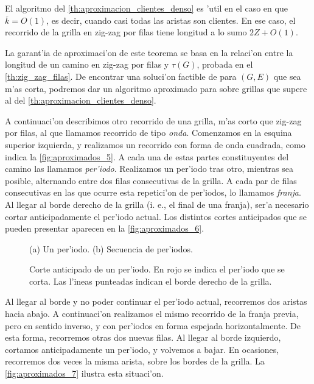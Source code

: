 El algoritmo del \autoref{th:aproximacion_clientes_denso} es 'util en el caso en que $\overline{k} = O(1)$, es decir, cuando casi todas las aristas son clientes. En ese caso, el recorrido de la grilla en zig-zag por filas tiene longitud a lo sumo $2Z + O(1)$.

La garant'ia de aproximaci'on de este teorema se basa en la relaci'on entre la longitud de un camino en zig-zag por filas y $\tau(G)$, probada en el \autoref{th:zig_zag_filas}. De encontrar una soluci'on factible de  para $(G, E)$ que sea m'as corta, podremos dar un algoritmo aproximado para  sobre grillas que supere al del \autoref{th:aproximacion_clientes_denso}.

A continuaci'on describimos otro recorrido de una grilla, m'as corto que zig-zag por filas, al que llamamos recorrido de tipo \textit{onda}. Comenzamos en la esquina superior izquierda, y realizamos un recorrido con forma de onda cuadrada, como indica la \autoref{fig:aproximados_5}. A cada una de estas partes constituyentes del camino las llamamos \textit{per'iodo}. Realizamos un per'iodo tras otro, mientras sea posible, alternando entre dos filas consecutivas de la grilla. A cada par de filas consecutivas en las que ocurre esta repetici'on de per'iodos, lo llamamos \textit{franja}. Al llegar al borde derecho de la grilla (i. e., el final de una franja), ser'a necesario cortar anticipadamente el per'iodo actual. Los distintos cortes anticipados que se pueden presentar aparecen en la \autoref{fig:aproximados_6}.

\begin{figure}[h]
	\begin{center}
		
	\end{center}
	\caption{(a) Un per'iodo. (b) Secuencia de per'iodos.}
	\label{fig:aproximados_5}
\end{figure}

\begin{figure}[h]
	\begin{center}
		
	\end{center}
	\caption{Corte anticipado de un per'iodo. En rojo se indica el per'iodo que se corta. Las l'ineas punteadas indican el borde derecho de la grilla.}
	\label{fig:aproximados_6}
\end{figure}

Al llegar al borde y no poder continuar el per'iodo actual, recorremos dos aristas hacia abajo. A continuaci'on realizamos el mismo recorrido de la franja previa, pero en sentido inverso, y con per'iodos en forma espejada horizontalmente. De esta forma, recorremos otras dos nuevas filas. Al llegar al borde izquierdo, cortamos anticipadamente un per'iodo, y volvemos a bajar. En ocasiones, recorremos dos veces la misma arista, sobre los bordes de la grilla. La \autoref{fig:aproximados_7} ilustra esta situaci'on.

